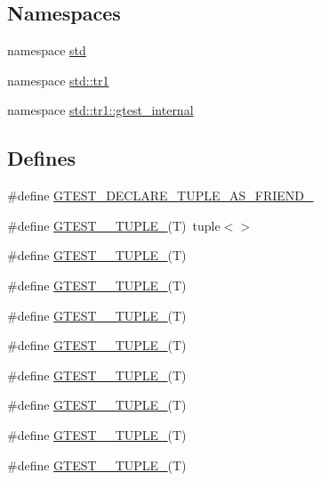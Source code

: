 \subsection*{\-Namespaces}
\begin{DoxyCompactItemize}
\item 
namespace \hyperlink{namespacestd}{std}
\item 
namespace \hyperlink{namespacestd_1_1tr1}{std\-::tr1}
\item 
namespace \hyperlink{namespacestd_1_1tr1_1_1gtest__internal}{std\-::tr1\-::gtest\-\_\-internal}
\end{DoxyCompactItemize}
\subsection*{\-Defines}
\begin{DoxyCompactItemize}
\item 
\#define \hyperlink{gtest-tuple_8h_a2b20671273f514a88a6e9b8328e5f257}{\-G\-T\-E\-S\-T\-\_\-\-D\-E\-C\-L\-A\-R\-E\-\_\-\-T\-U\-P\-L\-E\-\_\-\-A\-S\-\_\-\-F\-R\-I\-E\-N\-D\-\_\-}
\item 
\#define \hyperlink{gtest-tuple_8h_acecddf48fa29ec4b0199d5a467e89778}{\-G\-T\-E\-S\-T\-\_\-\_\-\-T\-U\-P\-L\-E\-\_\-}(\-T)~tuple$<$$>$
\item 
\#define \hyperlink{gtest-tuple_8h_a544374090885c4127adc2c618570323c}{\-G\-T\-E\-S\-T\-\_\-\_\-\-T\-U\-P\-L\-E\-\_\-}(\-T)
\item 
\#define \hyperlink{gtest-tuple_8h_a93229c3f009273c73eca237b4d19f326}{\-G\-T\-E\-S\-T\-\_\-\_\-\-T\-U\-P\-L\-E\-\_\-}(\-T)
\item 
\#define \hyperlink{gtest-tuple_8h_af2c3eab3f1a5197b408fce44eb3ed9da}{\-G\-T\-E\-S\-T\-\_\-\_\-\-T\-U\-P\-L\-E\-\_\-}(\-T)
\item 
\#define \hyperlink{gtest-tuple_8h_a3625feb24d5e6eb9926fd558e4a2e3ff}{\-G\-T\-E\-S\-T\-\_\-\_\-\-T\-U\-P\-L\-E\-\_\-}(\-T)
\item 
\#define \hyperlink{gtest-tuple_8h_a64e6f4a4cf55f62cde94066c6d5d5c74}{\-G\-T\-E\-S\-T\-\_\-\_\-\-T\-U\-P\-L\-E\-\_\-}(\-T)
\item 
\#define \hyperlink{gtest-tuple_8h_a53f36c86a979ed8285bf3c6f82f16483}{\-G\-T\-E\-S\-T\-\_\-\_\-\-T\-U\-P\-L\-E\-\_\-}(\-T)
\item 
\#define \hyperlink{gtest-tuple_8h_a8987baf82ee028d1d778447413a02c0c}{\-G\-T\-E\-S\-T\-\_\-\_\-\-T\-U\-P\-L\-E\-\_\-}(\-T)
\item 
\#define \hyperlink{gtest-tuple_8h_a2bc36d1a71a551e6cda2ac5504fb7ce3}{\-G\-T\-E\-S\-T\-\_\-\_\-\-T\-U\-P\-L\-E\-\_\-}(\-T)
$$
\end{DoxyCompactItemize}
